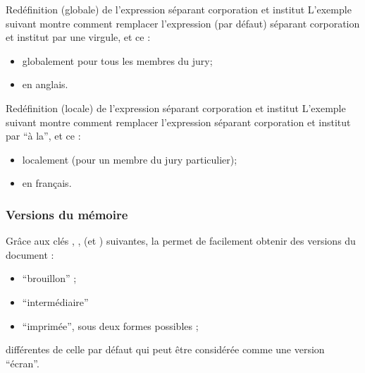 \begin{dbexample}{Redéfinition (globale) de l'expression séparant corporation et
    institut}{}
  L'exemple suivant montre comment remplacer l'expression (par défaut) séparant
  corporation et institut par une virgule, et ce :
  \begin{itemize}
  \item globalement pour tous les membres du jury;
  \item en anglais.
  \end{itemize}
\end{dbexample}

\begin{dbexample}{Redéfinition (locale) de l'expression séparant corporation et
    institut}{}
  L'exemple suivant montre comment remplacer l'expression séparant corporation
  et institut par \enquote{\textvisiblespace{}à la\textvisiblespace{}}, et ce :
  \begin{itemize}
  \item localement (pour un membre du jury particulier);
  \item en français.
  \end{itemize}
\begin{bodycode}
\end{bodycode}
\end{dbexample}

\subsubsection{Versions du mémoire}\label{sec:versions}

Grâce aux clés , ,  (et
) suivantes, la \yatcl{} permet de facilement obtenir des
versions du document :
\begin{itemize}
\item \enquote{brouillon} ;
\item \enquote{intermédiaire}
\item \enquote{imprimée}, sous deux formes possibles ;
\end{itemize}
différentes de celle par défaut qui peut être considérée comme une version
\enquote{écran}.

